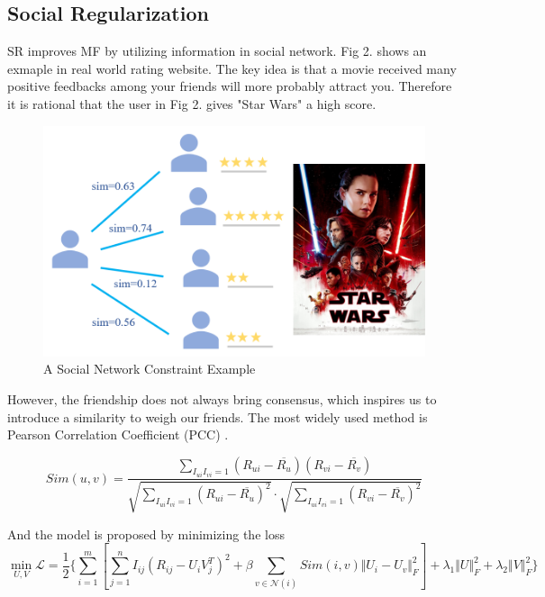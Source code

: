 \documentclass{article}
\begin{document}
\subsection{Social Regularization}
SR improves MF by utilizing information in social network. Fig 2. shows an exmaple in real world rating website. The key idea is that a movie 
received many positive feedbacks among your friends will more probably attract you. 
Therefore it is rational that the user in Fig 2. gives "Star Wars" a high score. 

\begin{figure}[h]
  \centering
  \includegraphics[scale=0.35]{pic/figure2.png}
  \caption{A Social Network Constraint Example}
\end{figure}

However, the friendship does not always bring consensus, which inspires us to introduce 
a similarity to weigh our friends. The most widely used method is 
Pearson Correlation Coefficient (PCC) \cite{bre1998pcc}.

\begin{equation}
  {Sim}(u, v) = \frac{\sum_{I_{ui} I_{vi} = 1} (R_{ui} - \overline{R_u}) (R_{vi} - \overline{R_v}) }
  {\sqrt{\sum_{I_{ui} I_{vi} = 1} (R_{ui} - \overline{R_u})^2} \cdot \sqrt{\sum_{I_{ui} I_{vi} = 1} (R_{vi} - \overline{R_v})^2}}
\end{equation}

And the model is proposed by minimizing the loss
\begin{equation}
  \min_{U, V} \mathcal{L} = \frac{1}{2} \{\sum_{i=1}^m [\sum_{j=1}^n I_{ij} (R_{ij} - U_iV_j^T)^2 + \beta \sum_{v \in \mathcal{N}(i)} {Sim}(i, v) \Vert U_i - U_v \Vert_F^2 ] + \lambda_1 \Vert U \Vert_F^2 + \lambda_2 \Vert V \Vert_F^2 \}
\end{equation}
\end{document}
